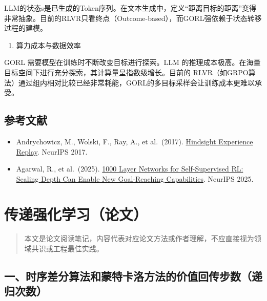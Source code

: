 LLM的状态s是已生成的Token序列。在文本生成中，定义``距离目标的距离''变得非常抽象。目前的RLVR只看终点（Outcome-based），而GORL强依赖于状态转移过程的建模。

\begin{enumerate}
\def\labelenumi{\arabic{enumi}.}
\setcounter{enumi}{2}
\tightlist
\item
  算力成本与数据效率
\end{enumerate}

GORL 需要模型在训练时不断改变目标进行探索。LLM 的推理成本极高。在海量目标空间下进行充分探索，其计算量呈指数级增长。目前的 RLVR（如GRPO算法）通过组内相对比较已经非常耗能，GORL的多目标采样会让训练成本更难以承受。

\hypertarget{ux53c2ux8003ux6587ux732e-64}{%
\subsection{参考文献}\label{ux53c2ux8003ux6587ux732e-64}}

\begin{itemize}
\tightlist
\item
  Andrychowicz, M., Wolski, F., Ray, A., et al.~(2017). \href{https://arxiv.org/abs/1707.01495}{Hindsight Experience Replay}. NeurIPS 2017.
\item
  Agarwal, R., et al.~(2025). \href{https://openreview.net/forum?id=ZMRJQg39iE}{1000 Layer Networks for Self-Supervised RL: Scaling Depth Can Enable New Goal-Reaching Capabilities}. NeurIPS 2025.
\end{itemize}

\clearpage

\hypertarget{ux4f20ux9012ux5f3aux5316ux5b66ux4e60ux8bbaux6587}{%
\section{传递强化学习（论文）}\label{ux4f20ux9012ux5f3aux5316ux5b66ux4e60ux8bbaux6587}}

\begin{quote}
本文是论文阅读笔记，内容代表对应论文方法或作者理解，不应直接视为领域共识或工程最佳实践。
\end{quote}

\hypertarget{ux4e00ux65f6ux5e8fux5deeux5206ux7b97ux6cd5ux548cux8499ux7279ux5361ux6d1bux65b9ux6cd5ux7684ux4ef7ux503cux56deux4f20ux6b65ux6570ux9012ux5f52ux6b21ux6570}{%
\subsection{一、时序差分算法和蒙特卡洛方法的价值回传步数（递归次数）}\label{ux4e00ux65f6ux5e8fux5deeux5206ux7b97ux6cd5ux548cux8499ux7279ux5361ux6d1bux65b9ux6cd5ux7684ux4ef7ux503cux56deux4f20ux6b65ux6570ux9012ux5f52ux6b21ux6570}}

